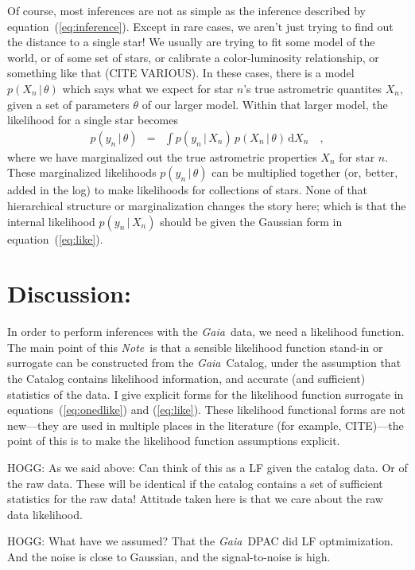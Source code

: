 \documentclass[12pt, modern]{aastex62}
\newcommand{\Gaia}{\textsl{Gaia}}
\newcommand{\documentname}{\textsl{Note}}
\newcommand{\equationname}{equation}
\newcommand{\dd}{\mathrm{d}}
\newcommand{\given}{\,|\,}
\begin{document}
Of course, most inferences are not as simple as the inference described by
\equationname~(\ref{eq:inference}).
Except in rare cases, we aren't just trying to find out the distance to a single
star!
We usually are trying to fit some model of the world, or of some set of stars,
or calibrate a color-luminosity relationship, or something like that (CITE VARIOUS).
In these cases, there is a model $p(X_n\given\theta)$ which says what we expect
for star $n$'s true astrometric quantites $X_n$, given a set of parameters $\theta$
of our larger model.
Within that larger model, the likelihood for a single star becomes
\begin{eqnarray}
p(y_n\given\theta) &=& \int p(y_n\given X_n)\,p(X_n\given\theta)\,\dd X_n
\quad ,
\end{eqnarray}
where we have marginalized out the true astrometric properties $X_n$ for star $n$.
These marginalized likelihoods $p(y_n\given\theta)$
can be multiplied together (or, better, added in the log)
to make likelihoods for collections of stars.
None of that hierarchical structure or marginalization changes the story here;
which is that the internal likelihood $p(y_n\given X_n)$ should be given the
Gaussian form in \equationname~(\ref{eq:like}).

\section{Discussion:}
In order to perform inferences
with the \Gaia\ data, we need a likelihood function.
The main point of this \documentname\ is that a sensible likelihood function
stand-in or surrogate can be constructed from the \Gaia\ Catalog, under the assumption
that the Catalog contains likelihood information, and accurate (and sufficient)
statistics of the data.
I give explicit forms for the likelihood function surrogate in
\equationname s~(\ref{eq:onedlike}) and (\ref{eq:like}).
These likelihood functional forms are not new---they are used in multiple places
in the literature (for example, CITE)---the point of this is to make the
likelihood function assumptions explicit.

HOGG: As we said above: Can think of this as a LF given the catalog data. Or of the raw data.
These will be identical if the catalog contains a set of sufficient statistics
for the raw data!
Attitude taken here is that we care about the raw data likelihood.

HOGG: What have we assumed? That the \Gaia\ DPAC did LF optmimization. And the
noise is close to Gaussian, and the signal-to-noise is high.
\end{document}
